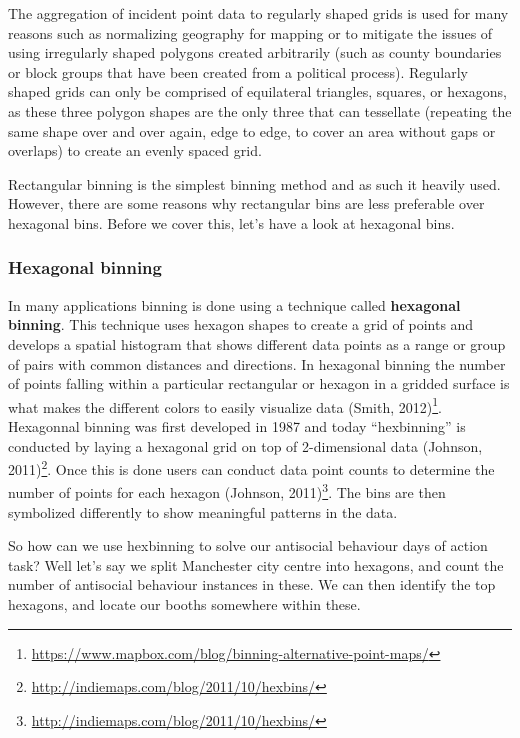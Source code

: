 \documentclass[
]{book}
\renewcommand{\href}[2]{#2\footnote{\url{#1}}}
\begin{document}
The aggregation of incident point data to regularly shaped grids is used for many reasons such as normalizing geography for mapping or to mitigate the issues of using irregularly shaped polygons created arbitrarily (such as county boundaries or block groups that have been created from a political process). Regularly shaped grids can only be comprised of equilateral triangles, squares, or hexagons, as these three polygon shapes are the only three that can tessellate (repeating the same shape over and over again, edge to edge, to cover an area without gaps or overlaps) to create an evenly spaced grid.

Rectangular binning is the simplest binning method and as such it heavily used. However, there are some reasons why rectangular bins are less preferable over hexagonal bins. Before we cover this, let's have a look at hexagonal bins.

\hypertarget{hexagonal-binning}{%
\subsubsection{Hexagonal binning}\label{hexagonal-binning}}

In many applications binning is done using a technique called \textbf{hexagonal binning}. This technique uses hexagon shapes to create a grid of points and develops a spatial histogram that shows different data points as a range or group of pairs with common distances and directions. In hexagonal binning the number of points falling within a particular rectangular or hexagon in a gridded surface is what makes the different colors to easily visualize data \href{https://www.mapbox.com/blog/binning-alternative-point-maps/}{(Smith, 2012)}. Hexagonnal binning was first developed in 1987 and today ``hexbinning'' is conducted by laying a hexagonal grid on top of 2-dimensional data \href{http://indiemaps.com/blog/2011/10/hexbins/}{(Johnson, 2011)}. Once this is done users can conduct data point counts to determine the number of points for each hexagon \href{http://indiemaps.com/blog/2011/10/hexbins/}{(Johnson, 2011)}. The bins are then symbolized differently to show meaningful patterns in the data.

So how can we use hexbinning to solve our antisocial behaviour days of action task? Well let's say we split Manchester city centre into hexagons, and count the number of antisocial behaviour instances in these. We can then identify the top hexagons, and locate our booths somewhere within these.
\end{document}
